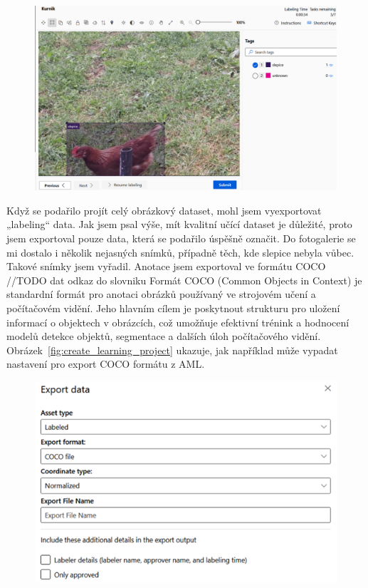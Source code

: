 \begin{figure}[H]
    \centering
    \includegraphics[width=1.0\textwidth]{img/chicken_labeling}
    \label{fig:chicken_labeling}
\end{figure}

Když se podařilo projít celý obrázkový dataset, mohl jsem vyexportovat „labeling“ data.
Jak jsem psal výše, mít kvalitní učící dataset je důležité, proto jsem exportoval pouze data, která se podařilo úspěšně označit.
Do fotogalerie se mi dostalo i několik nejasných snímků, případně těch, kde slepice nebyla vůbec.
Takové snímky jsem vyřadil.
Anotace jsem exportoval ve formátu COCO~\cite{COCOFormat}  //TODO dat odkaz do slovniku
Formát COCO (Common Objects in Context) je standardní formát pro anotaci obrázků používaný ve strojovém učení a počítačovém vidění.
Jeho hlavním cílem je poskytnout strukturu pro uložení informací o objektech v obrázcích, což umožňuje efektivní trénink a hodnocení modelů detekce objektů, segmentace a dalších úloh počítačového vidění.
Obrázek~\ref{fig:create_learning_project} ukazuje, jak například může vypadat nastavení pro export COCO formátu z AML.

\begin{figure}[H]
    \centering
    \includegraphics[width=1.0\textwidth]{img/export_coco_format}
    \label{fig:export_coco_format}
\end{figure}

